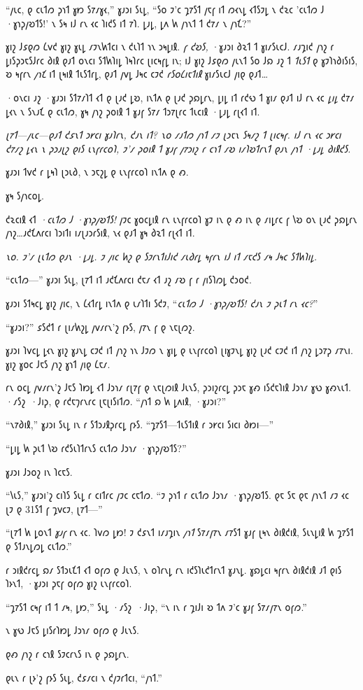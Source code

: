 “𐑢𐑧𐑤, 𐑞 𐑤𐑧𐑑𐑼 𐑜𐑪𐑑 𐑣𐑽 𐑕𐑳𐑥𐑣𐑬,” 𐑣𐑨𐑮𐑦 𐑕𐑧𐑛, “𐑕𐑴 𐑲'𐑤 𐑡𐑳𐑕𐑑 𐑢𐑱𐑝 𐑦𐑑 𐑼𐑬𐑯𐑛 𐑬𐑑𐑕𐑲𐑛 𐑯 𐑒𐑷𐑤 '𐑤𐑧𐑑𐑼 𐑓 ·𐑣𐑪𐑜𐑢𐑹𐑑𐑕!' 𐑯 𐑕𐑰 𐑦𐑓 𐑩𐑯 𐑬𐑤 𐑐𐑦𐑒𐑕 𐑦𐑑 𐑳𐑐. 𐑛𐑨𐑛, 𐑛𐑵 𐑿 𐑢𐑪𐑯𐑑 𐑑 𐑒𐑳𐑥 𐑯 𐑢𐑪𐑗?”

𐑣𐑦𐑟 𐑓𐑭𐑞𐑼 𐑖𐑫𐑒 𐑣𐑦𐑟 𐑣𐑧𐑛 𐑥𐑲𐑯𐑿𐑑𐑤𐑦 𐑯 𐑒𐑧𐑐𐑑 𐑪𐑯 𐑮𐑰𐑛𐑦𐑙. \emph{𐑝 𐑒𐑹𐑕,} ·𐑣𐑨𐑮𐑦 𐑔𐑷𐑑 𐑑 𐑣𐑦𐑥𐑕𐑧𐑤𐑓. 𐑥𐑨𐑡𐑦𐑒 𐑢𐑪𐑟 𐑩 𐑛𐑦𐑕𐑜𐑮𐑱𐑕𐑓𐑩𐑤 𐑔𐑦𐑙 𐑞𐑨𐑑 𐑴𐑯𐑤𐑦 𐑕𐑑𐑿𐑐𐑦𐑛 𐑐𐑰𐑐𐑩𐑤 𐑚𐑦𐑤𐑰𐑝𐑛 𐑦𐑯; 𐑦𐑓 𐑣𐑦𐑟 𐑓𐑭𐑞𐑼 𐑢𐑧𐑯𐑑 𐑕𐑴 𐑓𐑸 𐑨𐑟 𐑑 \emph{𐑑𐑧𐑕𐑑} 𐑞 𐑣𐑲𐑐𐑪𐑔𐑦𐑕𐑦𐑕, 𐑹 𐑰𐑝𐑩𐑯 \emph{𐑢𐑪𐑗} 𐑦𐑑 𐑚𐑰𐑦𐑙 𐑑𐑧𐑕𐑑𐑩𐑛, 𐑞𐑨𐑑 𐑢𐑫𐑛 𐑓𐑰𐑤 𐑤𐑲𐑒 \emph{𐑩𐑕𐑴𐑖𐑦𐑱𐑑𐑦𐑙} 𐑣𐑦𐑥𐑕𐑧𐑤𐑓 𐑢𐑦𐑞 𐑞𐑨𐑑…

·𐑴𐑯𐑤𐑦 𐑨𐑟 ·𐑣𐑨𐑮𐑦 𐑕𐑑𐑳𐑥𐑐𐑑 𐑬𐑑 𐑞 𐑚𐑨𐑒 𐑛𐑹, 𐑦𐑯𐑑𐑵 𐑞 𐑚𐑨𐑒 𐑜𐑸𐑛𐑩𐑯, 𐑛𐑦𐑛 𐑦𐑑 𐑩𐑒𐑻 𐑑 𐑣𐑦𐑥 𐑞𐑨𐑑 𐑦𐑓 𐑩𐑯 𐑬𐑤 \emph{𐑛𐑦𐑛} 𐑒𐑳𐑥 𐑛𐑬𐑯 𐑯 𐑕𐑯𐑨𐑗 𐑞 𐑤𐑧𐑑𐑼, 𐑣𐑰 𐑢𐑪𐑟 𐑜𐑴𐑦𐑙 𐑑 𐑣𐑨𐑝 𐑕𐑳𐑥 𐑑𐑮𐑳𐑚𐑩𐑤 𐑑𐑧𐑤𐑦𐑙 ·𐑛𐑨𐑛 𐑩𐑚𐑬𐑑 𐑦𐑑.

\emph{𐑚𐑳𐑑—𐑢𐑧𐑤—𐑞𐑨𐑑 𐑒𐑭𐑯𐑑 \emph{𐑮𐑾𐑤𐑦} 𐑣𐑨𐑐𐑩𐑯, 𐑒𐑨𐑯 𐑦𐑑? 𐑯𐑴 𐑥𐑨𐑑𐑼 𐑢𐑪𐑑 𐑥𐑲 𐑚𐑮𐑱𐑯 𐑕𐑰𐑥𐑟 𐑑 𐑚𐑦𐑤𐑰𐑝. 𐑦𐑓 𐑩𐑯 𐑬𐑤 𐑮𐑾𐑤𐑦 𐑒𐑳𐑥𐑟 𐑛𐑬𐑯 𐑯 𐑜𐑮𐑨𐑚𐑟 𐑞𐑦𐑕 𐑧𐑯𐑝𐑩𐑤𐑴𐑐, 𐑲'𐑥 𐑜𐑴𐑦𐑙 𐑑 𐑣𐑨𐑝 𐑢𐑳𐑮𐑦𐑟 𐑩 𐑤𐑪𐑑 𐑥𐑹 𐑦𐑥𐑐𐑹𐑑𐑩𐑯𐑑 𐑞𐑨𐑯 𐑢𐑪𐑑 ·𐑛𐑨𐑛 𐑔𐑦𐑙𐑒𐑕.}

𐑣𐑨𐑮𐑦 𐑑𐑫𐑒 𐑩 𐑛𐑰𐑐 𐑚𐑮𐑧𐑔, 𐑯 𐑮𐑱𐑟𐑛 𐑞 𐑧𐑯𐑝𐑩𐑤𐑴𐑐 𐑦𐑯𐑑𐑵 𐑞 𐑺.

𐑣𐑰 𐑕𐑢𐑪𐑤𐑴𐑛.

𐑒𐑷𐑤𐑦𐑙 𐑬𐑑 \emph{·𐑤𐑧𐑑𐑼 𐑓 ·𐑣𐑪𐑜𐑢𐑹𐑑𐑕!} 𐑢𐑲𐑤 𐑣𐑴𐑤𐑛𐑦𐑙 𐑩𐑯 𐑧𐑯𐑝𐑩𐑤𐑴𐑐 𐑣𐑲 𐑦𐑯 𐑞 𐑺 𐑦𐑯 𐑞 𐑥𐑦𐑛𐑩𐑤 𐑝 𐑘𐑹 𐑴𐑯 𐑚𐑨𐑒 𐑜𐑸𐑛𐑩𐑯 𐑢𐑪𐑟…𐑨𐑒𐑗𐑵𐑩𐑤𐑦 𐑐𐑮𐑦𐑑𐑦 𐑦𐑥𐑚𐑨𐑮𐑩𐑕𐑦𐑙, 𐑯𐑬 𐑞𐑨𐑑 𐑣𐑰 𐑔𐑷𐑑 𐑩𐑚𐑬𐑑 𐑦𐑑.

\emph{𐑯𐑴. 𐑲'𐑥 𐑚𐑧𐑑𐑼 𐑞𐑨𐑯 ·𐑛𐑨𐑛. 𐑲 𐑢𐑦𐑤 𐑿𐑟 𐑞 𐑕𐑲𐑩𐑯𐑑𐑦𐑓𐑦𐑒 𐑥𐑧𐑔𐑩𐑛 𐑰𐑝𐑩𐑯 𐑦𐑓 𐑦𐑑 𐑥𐑱𐑒𐑕 𐑥𐑰 𐑓𐑰𐑤 𐑕𐑑𐑿𐑐𐑦𐑛.}

“𐑤𐑧𐑑𐑼—” 𐑣𐑨𐑮𐑦 𐑕𐑧𐑛, 𐑚𐑳𐑑 𐑦𐑑 𐑨𐑒𐑗𐑵𐑩𐑤𐑦 𐑒𐑱𐑥 𐑬𐑑 𐑨𐑟 𐑥𐑹 𐑝 𐑩 𐑢𐑦𐑕𐑐𐑼𐑛 𐑒𐑮𐑴𐑒.

𐑣𐑨𐑮𐑦 𐑕𐑑𐑰𐑤𐑛 𐑣𐑦𐑟 𐑢𐑦𐑤, 𐑯 𐑖𐑬𐑑𐑩𐑛 𐑦𐑯𐑑𐑵 𐑞 𐑧𐑥𐑐𐑑𐑦 𐑕𐑒𐑲, “\emph{𐑤𐑧𐑑𐑼 𐑓 ·𐑣𐑪𐑜𐑢𐑹𐑑𐑕! 𐑒𐑨𐑯 𐑲 𐑜𐑧𐑑 𐑩𐑯 𐑬𐑤?}”

“𐑣𐑨𐑮𐑦?” 𐑭𐑕𐑒𐑑 𐑩 𐑚𐑦𐑥𐑿𐑟𐑛 𐑢𐑫𐑥𐑩𐑯'𐑟 𐑝𐑶𐑕, 𐑢𐑳𐑯 𐑝 𐑞 𐑯𐑱𐑚𐑼𐑟.

𐑣𐑨𐑮𐑦 𐑐𐑫𐑤𐑛 𐑛𐑬𐑯 𐑣𐑦𐑟 𐑣𐑨𐑯𐑛 𐑤𐑲𐑒 𐑦𐑑 𐑢𐑪𐑟 𐑪𐑯 𐑓𐑲𐑼 𐑯 𐑣𐑦𐑛 𐑞 𐑧𐑯𐑝𐑩𐑤𐑴𐑐 𐑚𐑦𐑣𐑲𐑯𐑛 𐑣𐑦𐑟 𐑚𐑨𐑒 𐑤𐑲𐑒 𐑦𐑑 𐑢𐑪𐑟 𐑛𐑮𐑳𐑜 𐑥𐑳𐑯𐑦. 𐑣𐑦𐑟 𐑣𐑴𐑤 𐑓𐑱𐑕 𐑢𐑪𐑟 𐑣𐑪𐑑 𐑢𐑦𐑞 𐑖𐑱𐑥.

𐑩𐑯 𐑴𐑤𐑛 𐑢𐑫𐑥𐑩𐑯'𐑟 𐑓𐑱𐑕 𐑐𐑽𐑛 𐑬𐑑 𐑓𐑮𐑪𐑥 𐑩𐑚𐑳𐑝 𐑞 𐑯𐑱𐑚𐑼𐑦𐑙 𐑓𐑧𐑯𐑕, 𐑜𐑮𐑦𐑟𐑩𐑤𐑛 𐑜𐑮𐑱 𐑣𐑺 𐑦𐑕𐑒𐑱𐑐𐑦𐑙 𐑓𐑮𐑪𐑥 𐑣𐑻 𐑣𐑺𐑯𐑧𐑑. ·𐑥𐑕𐑟~·𐑓𐑦𐑜, 𐑞 𐑩𐑒𐑱𐑠𐑩𐑯𐑩𐑤 𐑚𐑱𐑚𐑦𐑕𐑦𐑑𐑼. “𐑢𐑪𐑑 𐑸 𐑿 𐑛𐑵𐑦𐑙, ·𐑣𐑨𐑮𐑦?”

“𐑯𐑳𐑔𐑦𐑙,” 𐑣𐑨𐑮𐑦 𐑕𐑧𐑛 𐑦𐑯 𐑩 𐑕𐑑𐑮𐑨𐑙𐑜𐑩𐑤𐑛 𐑝𐑶𐑕. “𐑡𐑳𐑕𐑑—𐑑𐑧𐑕𐑑𐑦𐑙 𐑩 𐑮𐑾𐑤𐑦 𐑕𐑦𐑤𐑦 𐑔𐑽𐑦—”

“𐑛𐑦𐑛 𐑿 𐑜𐑧𐑑 𐑘𐑹 𐑩𐑒𐑕𐑧𐑐𐑑𐑩𐑯𐑕 𐑤𐑧𐑑𐑼 𐑓𐑮𐑪𐑥 ·𐑣𐑪𐑜𐑢𐑹𐑑𐑕?”

𐑣𐑨𐑮𐑦 𐑓𐑮𐑴𐑟 𐑦𐑯 𐑐𐑤𐑱𐑕.

“𐑘𐑧𐑕,” 𐑣𐑨𐑮𐑦'𐑟 𐑤𐑦𐑐𐑕 𐑕𐑧𐑛 𐑩 𐑤𐑦𐑑𐑩𐑤 𐑢𐑲𐑤 𐑤𐑱𐑑𐑼. “𐑲 𐑜𐑪𐑑 𐑩 𐑤𐑧𐑑𐑼 𐑓𐑮𐑪𐑥 ·𐑣𐑪𐑜𐑢𐑹𐑑𐑕. 𐑞𐑱 𐑕𐑱 𐑞𐑱 𐑢𐑪𐑯𐑑 𐑥𐑲 𐑬𐑤 𐑚𐑲 𐑞 31𐑕𐑑 𐑝 𐑡𐑫𐑤𐑲, 𐑚𐑳𐑑—”

“𐑚𐑳𐑑 𐑿 𐑛𐑴𐑯𐑑 \emph{𐑣𐑨𐑝} 𐑩𐑯 𐑬𐑤. 𐑐𐑫𐑼 𐑛𐑽! 𐑲 𐑒𐑭𐑯𐑑 𐑦𐑥𐑨𐑡𐑦𐑯 \emph{𐑢𐑪𐑑} 𐑕𐑳𐑥𐑢𐑳𐑯 𐑥𐑳𐑕𐑑 𐑣𐑨𐑝 𐑚𐑰𐑯 𐑔𐑦𐑙𐑒𐑦𐑙, 𐑕𐑧𐑯𐑛𐑦𐑙 𐑿 𐑡𐑳𐑕𐑑 𐑞 𐑕𐑑𐑨𐑯𐑛𐑼𐑛 𐑤𐑧𐑑𐑼.”

𐑩 𐑮𐑦𐑙𐑒𐑩𐑤𐑛 𐑸𐑥 𐑕𐑑𐑮𐑧𐑗𐑑 𐑬𐑑 𐑴𐑝𐑼 𐑞 𐑓𐑧𐑯𐑕, 𐑯 𐑴𐑐𐑩𐑯𐑛 𐑩𐑯 𐑦𐑒𐑕𐑐𐑧𐑒𐑑𐑩𐑯𐑑 𐑣𐑨𐑯𐑛. 𐑣𐑸𐑛𐑤𐑦 𐑰𐑝𐑩𐑯 𐑔𐑦𐑙𐑒𐑦𐑙 𐑨𐑑 𐑞𐑦𐑕 𐑐𐑶𐑯𐑑, ·𐑣𐑨𐑮𐑦 𐑜𐑱𐑝 𐑴𐑝𐑼 𐑣𐑦𐑟 𐑧𐑯𐑝𐑩𐑤𐑴𐑐.

“𐑡𐑳𐑕𐑑 𐑤𐑰𐑝 𐑦𐑑 𐑑 𐑥𐑰, 𐑛𐑽,” 𐑕𐑧𐑛 ·𐑥𐑕𐑟~·𐑓𐑦𐑜, “𐑯 𐑦𐑯 𐑩 𐑡𐑦𐑓𐑦 𐑹 𐑑𐑵 𐑲'𐑤 𐑣𐑨𐑝 𐑕𐑳𐑥𐑢𐑳𐑯 𐑴𐑝𐑼.”

𐑯 𐑣𐑻 𐑓𐑱𐑕 𐑛𐑦𐑕𐑩𐑐𐑽𐑛 𐑓𐑮𐑪𐑥 𐑴𐑝𐑼 𐑞 𐑓𐑧𐑯𐑕.

𐑞𐑺 𐑢𐑪𐑟 𐑩 𐑤𐑪𐑙 𐑕𐑲𐑤𐑩𐑯𐑕 𐑦𐑯 𐑞 𐑜𐑸𐑛𐑩𐑯.

𐑞𐑧𐑯 𐑩 𐑚𐑶'𐑟 𐑝𐑶𐑕 𐑕𐑧𐑛, 𐑒𐑭𐑥𐑤𐑦 𐑯 𐑒𐑢𐑲𐑩𐑑𐑤𐑦, “𐑢𐑪𐑑.”
